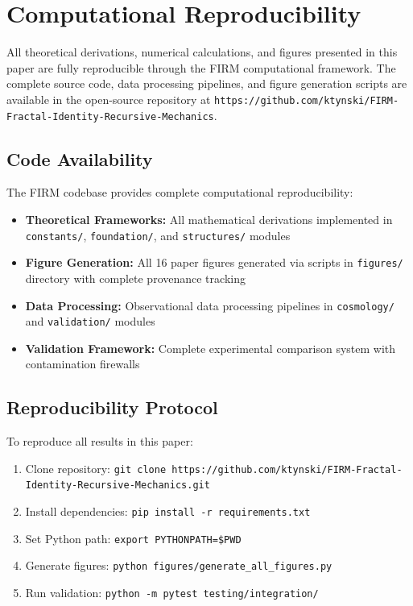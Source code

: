 \documentclass[12pt]{article}
\begin{document}




\section{Computational Reproducibility}

All theoretical derivations, numerical calculations, and figures presented in this paper are fully reproducible through the FIRM computational framework. The complete source code, data processing pipelines, and figure generation scripts are available in the open-source repository at \texttt{https://github.com/ktynski/FIRM-Fractal-Identity-Recursive-Mechanics}.

\subsection{Code Availability}

The FIRM codebase provides complete computational reproducibility:

\begin{itemize}
    \item \textbf{Theoretical Frameworks:} All mathematical derivations implemented in \texttt{constants/}, \texttt{foundation/}, and \texttt{structures/} modules
    \item \textbf{Figure Generation:} All 16 paper figures generated via scripts in \texttt{figures/} directory with complete provenance tracking
    \item \textbf{Data Processing:} Observational data processing pipelines in \texttt{cosmology/} and \texttt{validation/} modules
    \item \textbf{Validation Framework:} Complete experimental comparison system with contamination firewalls
\end{itemize}

\subsection{Reproducibility Protocol}

To reproduce all results in this paper:

\begin{enumerate}
    \item Clone repository: \texttt{git clone https://github.com/ktynski/FIRM-Fractal-Identity-Recursive-Mechanics.git}
    \item Install dependencies: \texttt{pip install -r requirements.txt}
    \item Set Python path: \texttt{export PYTHONPATH=\$PWD}
    \item Generate figures: \texttt{python figures/generate\_all\_figures.py}
    \item Run validation: \texttt{python -m pytest testing/integration/}
\end{enumerate}
\end{document}

